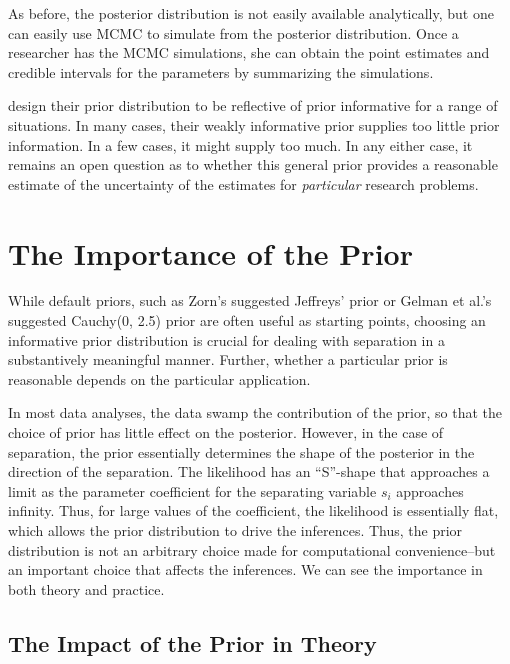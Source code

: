 \documentclass[12pt]{article}
\begin{document}
As before, the posterior distribution is not easily available analytically, but one can easily use MCMC to simulate from the posterior distribution. Once a researcher has the MCMC simulations, she can obtain the point estimates and credible intervals for the parameters by summarizing the simulations. 

\cite{Gelmanetal2008} design their prior distribution to be reflective of prior informative for a range of situations. In many cases, their weakly informative prior supplies too little prior information. In a few cases, it might supply too much. In any either case, it remains an open question as to whether this general prior provides a reasonable estimate of the uncertainty of the estimates for \emph{particular} research problems.

\section*{The Importance of the Prior}

While default priors, such as Zorn's suggested Jeffreys' prior or Gelman et al.'s suggested Cauchy(0, 2.5) prior are often useful as starting points, choosing an informative prior distribution is crucial for dealing with separation in a substantively meaningful manner. Further, whether a particular prior is reasonable depends on the particular application.

In most data analyses, the data swamp the contribution of the prior, so that the choice of prior has little effect on the posterior. However, in the case of separation, the prior essentially determines the shape of the posterior in the direction of the separation. The likelihood has an ``S''-shape that approaches a limit as the parameter coefficient for the separating variable $s_i$ approaches infinity. Thus, for large values of the coefficient, the likelihood is essentially flat, which allows the prior distribution to drive the inferences. Thus, the prior distribution is not an arbitrary choice made for computational convenience--but an important choice that affects the inferences. We can see the importance in both theory and practice.

\subsection*{The Impact of the Prior in Theory}
\end{document}
